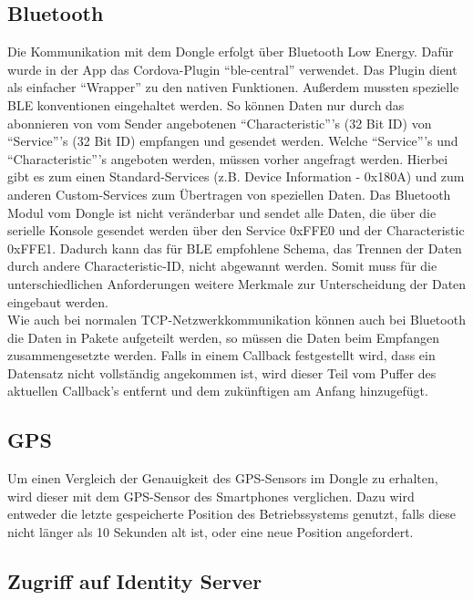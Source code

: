 \subsection{Bluetooth}
\label{sec:appBluetooth}

Die Kommunikation mit dem Dongle erfolgt über Bluetooth Low Energy. Dafür wurde in der App das Cordova-Plugin \enquote{ble-central} verwendet. Das Plugin dient als einfacher \enquote{Wrapper} zu den nativen Funktionen. Außerdem mussten spezielle BLE konventionen eingehaltet werden. So können Daten nur durch das abonnieren von vom Sender angebotenen \enquote{Characteristic}'s (32 Bit ID) von \enquote{Service}'s (32 Bit ID) empfangen und gesendet werden. Welche \enquote{Service}'s und \enquote{Characteristic}'s angeboten werden, müssen vorher angefragt  werden. Hierbei gibt es zum einen Standard-Services (z.B. Device Information - 0x180A) und zum anderen Custom-Services zum Übertragen von speziellen Daten. Das Bluetooth Modul vom Dongle ist nicht veränderbar und sendet alle Daten, die über die serielle Konsole gesendet werden über den Service 0xFFE0 und der Characteristic 0xFFE1. Dadurch kann das für BLE empfohlene Schema, das Trennen der Daten durch andere Characteristic-ID, nicht abgewannt werden. Somit muss für die unterschiedlichen Anforderungen weitere Merkmale zur Unterscheidung der Daten eingebaut werden.\cite{BluetoothLowEnergy}
\\
Wie auch bei normalen TCP-Netzwerkkommunikation können auch bei Bluetooth die Daten in Pakete aufgeteilt werden, so müssen die Daten beim Empfangen zusammengesetzte werden. Falls in einem Callback festgestellt wird, dass ein Datensatz nicht vollständig angekommen ist, wird dieser Teil vom Puffer des aktuellen Callback's entfernt und dem zukünftigen am Anfang hinzugefügt.

\subsection{GPS}
\label{sec:appGPS}

Um einen Vergleich der Genauigkeit des GPS-Sensors im Dongle zu erhalten, wird dieser mit dem GPS-Sensor des Smartphones verglichen. Dazu wird entweder die letzte gespeicherte Position des Betriebssystems genutzt, falls diese nicht länger als 10 Sekunden alt ist, oder eine neue Position angefordert.

\subsection{Zugriff auf Identity Server}

